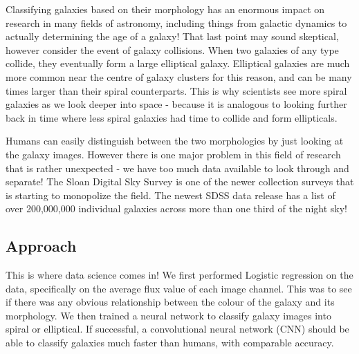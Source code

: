 Classifying galaxies based on their morphology has an enormous impact on research in many fields of astronomy, including things from galactic dynamics to actually determining the age of a galaxy!
That last point may sound skeptical, however consider the event of galaxy collisions.
When two galaxies of any type collide, they eventually form a large elliptical galaxy. 
Elliptical galaxies are much more common near the centre of galaxy clusters for this reason, and can be many times larger than their spiral counterparts.
This is why scientists see more spiral galaxies as we look deeper into space - because it is analogous to looking further back in time where less spiral galaxies had time to collide and form ellipticals. 


Humans can easily distinguish between the two morphologies by just looking at the galaxy images. 
However there is one major problem in this field of research that is rather unexpected - we have too much data available to look through and separate! 
The Sloan Digital Sky Survey is one of the newer collection surveys that is starting to monopolize the field. The newest SDSS data release has a list of over 200,000,000 individual galaxies across more than one third of the night sky\cite{SDSS}!

\subsection{Approach}
This is where data science comes in!
We first performed Logistic regression on the data, specifically on the average flux value of each image channel. 
This was to see if there was any obvious relationship between the colour of the galaxy and its morphology. 
We then trained a neural network to classify galaxy images into spiral or elliptical.
If successful, a convolutional neural network (CNN) should be able to classify galaxies much faster than humans, with comparable accuracy.












